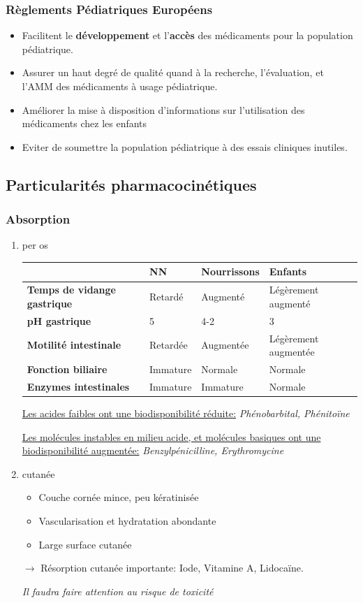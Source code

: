 \documentclass[11pt]{article}
\begin{document}
\subsubsection{Règlements Pédiatriques Européens}
\label{sec:orgb0d6549}
\begin{itemize}
\item Facilitent le \textbf{développement} et l'\textbf{accès} des médicaments pour la population pédiatrique.
\item Assurer un haut degré de qualité quand à la recherche, l'évaluation, et l'AMM des médicaments à usage pédiatrique.
\item Améliorer la mise à disposition d'informations sur l'utilisation des médicaments chez les enfants
\item Eviter de soumettre la population pédiatrique à des essais cliniques inutiles.
\end{itemize}
\subsection{Particularités pharmacocinétiques}
\label{sec:org9adaf71}
\subsubsection{Absorption}
\label{sec:org5bd2ee1}
\begin{enumerate}
\item per os
\label{sec:orge08e568}
\begin{center}
\begin{tabular}{llll}
 & NN & Nourrissons & Enfants\\
\hline
\textbf{Temps de vidange gastrique} & Retardé & Augmenté & Légèrement augmenté\\
\textbf{pH gastrique} & 5 & 4-2 & 3\\
\textbf{Motilité intestinale} & Retardée & Augmentée & Légèrement augmentée\\
\textbf{Fonction biliaire} & Immature & Normale & Normale\\
\textbf{Enzymes intestinales}\footnotemark & Immature & Immature & Normale\\
\end{tabular}
\end{center}
\uline{Les acides faibles ont une biodisponibilité réduite:} \emph{Phénobarbital, Phénitoïne}

\uline{Les molécules instables en milieu acide, et molécules basiques  ont une biodisponibilité augmentée:} \emph{Benzylpénicilline, Erythromycine}
\item cutanée
\label{sec:org3ed24af}
\begin{itemize}
\item Couche cornée mince, peu kératinisée
\item Vascularisation et hydratation abondante
\item Large surface cutanée
\end{itemize}
\(\to\) Résorption cutanée importante: Iode, Vitamine A, Lidocaïne.

\emph{Il faudra faire attention au risque de toxicité}
\end{enumerate}
\end{document}
